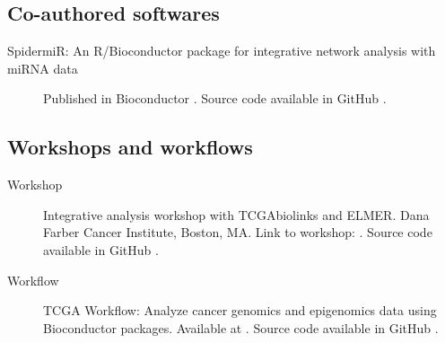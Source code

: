 \subsection{Co-authored softwares}
\begin{description}
	\item[SpidermiR: An R/Bioconductor package for integrative network analysis with miRNA data]{Published in Bioconductor . Source code available in GitHub }.
\end{description}


\subsection{Workshops and workflows}
\begin{description}
\item[Workshop]{Integrative analysis workshop with TCGAbiolinks and ELMER. Dana Farber Cancer Institute, Boston, MA. Link to workshop: . Source code available in GitHub .}
\item[Workflow]{TCGA Workflow: Analyze cancer genomics and epigenomics data using Bioconductor packages. Available at . Source code available in GitHub .}

\end{description}

